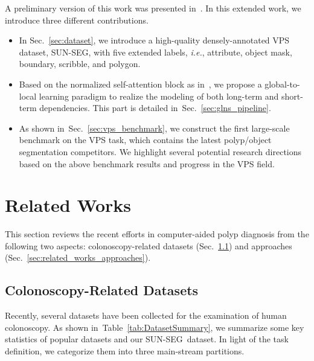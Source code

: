 \documentclass[default,iicol]{sn-jnl}
\theoremstyle{thmstyleone}
\theoremstyle{thmstyletwo}
\theoremstyle{thmstylethree}
\newcommand{\tabref}[1]{Table~\ref{#1}}
\newcommand{\secref}[1]{Sec.~\ref{#1}}
\def\ie{\emph{i.e.}}
\def\ourdataset{SUN-SEG}
\begin{document}
A preliminary version of this work was presented in~\cite{ji2021pnsnet}.
In this extended work, we introduce three different contributions.
\begin{itemize}
    \item In \secref{sec:dataset}, we introduce a high-quality densely-annotated VPS dataset, \ourdataset, with five extended labels, \ie, attribute, object mask, boundary, scribble, and polygon.
\item Based on the normalized self-attention block as in~\cite{ji2021pnsnet}, we propose a global-to-local learning paradigm to realize the modeling of both long-term and short-term dependencies.
This part is detailed in~\secref{sec:glns_pipeline}.
\item As shown in~\secref{sec:vps_benchmark}, we construct the first large-scale benchmark on the VPS task, which contains  the latest polyp/object segmentation competitors.
We highlight several potential research directions based on the above benchmark results and progress in the VPS field.
\end{itemize}

\section{Related Works}
This section reviews the recent efforts in computer-aided polyp diagnosis from the following two aspects: colonoscopy-related datasets (\secref{sec:related_works_datasets}) and approaches (\secref{sec:related_works_approaches}).

\subsection{Colonoscopy-Related Datasets}\label{sec:related_works_datasets}
Recently, several datasets have been collected for the examination of human colonoscopy.
As shown in~\tabref{tab:DatasetSummary}, we summarize some key statistics of  popular datasets and our \ourdataset~dataset.
In light of the task definition, we categorize them into three main-stream partitions.
\end{document}
